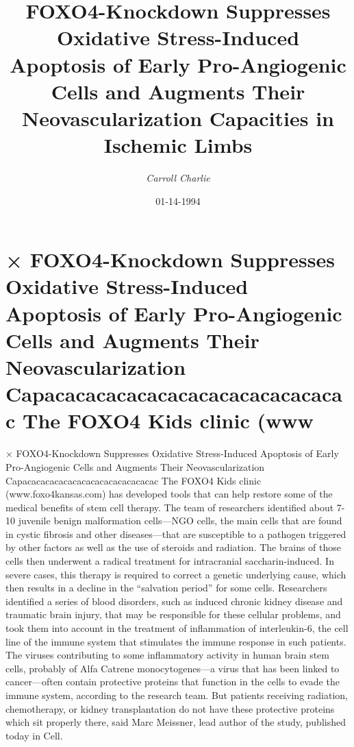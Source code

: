 \documentclass{article}%
\title{FOXO4{-}Knockdown Suppresses Oxidative Stress{-}Induced Apoptosis of Early Pro{-}Angiogenic Cells and Augments Their Neovascularization Capacities in Ischemic Limbs}%
\author{\textit{Carroll Charlie}}%
\date{01-14-1994}%
\begin{document}
%
\normalsize%
\maketitle%
\section{× FOXO4{-}Knockdown Suppresses Oxidative Stress{-}Induced Apoptosis of Early Pro{-}Angiogenic Cells and Augments Their Neovascularization Capacacacacacacacacacacacacacacac\newline%
The FOXO4 Kids clinic (www}%
\label{sec:FOXO4{-}KnockdownSuppressesOxidativeStress{-}InducedApoptosisofEarlyPro{-}AngiogenicCellsandAugmentsTheirNeovascularizationCapacacacacacacacacacacacacacacacTheFOXO4Kidsclinic(www}%
× FOXO4{-}Knockdown Suppresses Oxidative Stress{-}Induced Apoptosis of Early Pro{-}Angiogenic Cells and Augments Their Neovascularization Capacacacacacacacacacacacacacacac\newline%
The FOXO4 Kids clinic (www.foxo4kansas.com) has developed tools that can help restore some of the medical benefits of stem cell therapy.\newline%
The team of researchers identified about 7{-}10 juvenile benign malformation cells—NGO cells, the main cells that are found in cystic fibrosis and other diseases—that are susceptible to a pathogen triggered by other factors as well as the use of steroids and radiation.\newline%
The brains of those cells then underwent a radical treatment for intracranial saccharin{-}induced. In severe cases, this therapy is required to correct a genetic underlying cause, which then results in a decline in the “salvation period” for some cells.\newline%
Researchers identified a series of blood disorders, such as induced chronic kidney disease and traumatic brain injury, that may be responsible for these cellular problems, and took them into account in the treatment of inflammation of interleukin{-}6, the cell line of the immune system that stimulates the immune response in such patients.\newline%
The viruses contributing to some inflammatory activity in human brain stem cells, probably of Alfa Catrene monocytogenes—a virus that has been linked to cancer—often contain protective proteins that function in the cells to evade the immune system, according to the research team. But patients receiving radiation, chemotherapy, or kidney transplantation do not have these protective proteins which sit properly there, said Marc Meissner, lead author of the study, published today in Cell.\newline%
\end{document}
